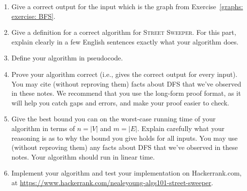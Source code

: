 \documentclass[11pt]{article}
\begin{document}
\begin{enumerate}[label=(\alph*)]
\item Give a correct output for the input which is the graph from Exercise~\ref{graphs: exercise: BFS}.


  \item Give a definition for a correct algorithm for \textsc{Street Sweeper}. 
    For this part, explain clearly in a few English sentences exactly what your algorithm does.

\item Define your algorithm in pseudocode.


\item
  Prove your algorithm correct (i.e., gives the correct output for every input).
  You may cite (without reproving them) facts about DFS that we've observed in these notes.
  We recommend that you use the long-form proof format, as it will help you catch
  gaps and errors, and make your proof easier to check.





\item Give the best bound you can on the worst-case running time of your algorithm in terms of $n=|V|$ and $m=|E|$.
  Explain carefully what your reasoning is as to why the bound you give holds for all inputs.
  You may use (without reproving them) any facts about DFS that we've observed in these notes.
  Your algorithm should run in linear time.

\item Implement your algorithm and test your implementation on Hackerrank.com, at
  \url{https://www.hackerrank.com/nealeyoung-algs101-street-sweeper}.
\end{enumerate}
\end{document}
